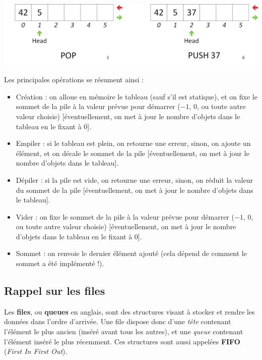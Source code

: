 \begin{center}
\includegraphics[scale=0.65]{Cours/Piles_6_Tableau_Statique_Usage_pack_3.png}
\end{center}

\smallskip

Les principales opérations se résument ainsi :
\begin{itemize}
\item Création : on alloue en mémoire le tableau (sauf s'il est statique), et on fixe le sommet de la pile à la valeur prévue pour démarrer ($ -1 $, $ 0 $, ou toute autre valeur choisie) [éventuellement, on met à jour le nombre d'objets dans le tableau en le fixant à $ 0 $].
\item Empiler : si le tableau est plein, on retourne une erreur, sinon, on ajoute un élément, et on décale le sommet de la pile [éventuellement, on met à jour le nombre d'objets dans le tableau].
\item Dépiler : si la pile est vide, on retourne une erreur, sinon, on réduit la valeur du sommet de la pile [éventuellement, on met à jour le nombre d'objets dans le tableau].
\item Vider : on fixe le sommet de la pile à la valeur prévue pour démarrer ($ -1 $, $ 0 $, ou toute autre valeur choisie) [éventuellement, on met à jour le nombre d'objets dans le tableau en le fixant à $ 0 $].
\item Sommet : on renvoie le dernier élément ajouté (cela dépend de comment le sommet a été implémenté !).
\end{itemize}

\bigskip



\subsection{Rappel sur les files}

\bigskip

Les \textbf{files}, ou \textbf{queues} en anglais, sont des structures visant à stocker et rendre les données dans l'ordre d'arrivée.
Une file dispose donc d'une \textit{tête} contenant l'élément le plus ancien (inséré avant tous les autres), et une \textit{queue} contenant l'élément inséré le plus récemment.
Ces structures sont aussi appelées \textbf{FIFO} (\textit{First In First Out}).\\

